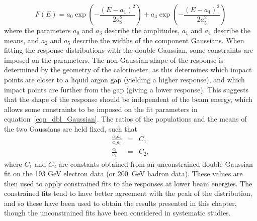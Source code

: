 \begin{equation}
F(E) = a_0 \exp \left( - \frac{(E - a_1)^2}{2 a_2^2} \right ) +  a_3 \exp \left( - \frac{(E - a_4)^2}{2 a_5^2} \right)
\label{eqn_dbl_Gaussian}
\end{equation}
where the parameters $a_0$ and $a_3$ describe the amplitudes, $a_1$ and $a_4$ describe the means, and $a_2$ and $a_5$ describe the widths of the component Gaussians. 
When fitting the response distributions with the double Gaussian, some constraints are imposed on the parameters. The non-Gaussian shape of the response is determined by the geometry of the calorimeter, as this determines which impact points are closer to a liquid argon gap (yielding a higher response), and which impact points are further from the gap (giving a lower response). This suggests that the shape of the response should be independent of the beam energy, which allows some constraints to be imposed on the fit parameters in equation~\ref{eqn_dbl_Gaussian}. The ratios of the populations and the means of the two Gaussians are held fixed, such that
\begin{eqnarray}
\frac{a_0 a_2}{a_3 a_5} & = & C_1 \label{eqn_constraint_1}\\
\frac{a_1}{a_4} & = & C_2,
\label{eqn_constraint_2}
\end{eqnarray}
where $C_1$ and $C_2$ are constants obtained from an unconstrained double Gaussian fit on the 193 GeV electron data (or 200~GeV hadron data). These values are then used to apply constrained fits to the responses at lower beam energies. The constrained fits tend to have better agreement with the peak of the distribution, and so these have been used to obtain the results presented in this chapter, though the unconstrained fits have been considered in systematic studies.
%
%
%
%
%
%
%
%
%

